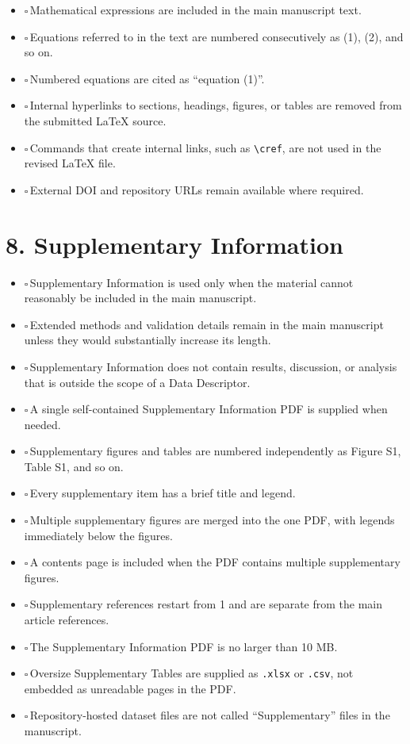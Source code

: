 \documentclass[11pt]{article}
\newcommand{\cbox}{$\square$\,}
\begin{document}
\begin{itemize}
    \item \cbox Mathematical expressions are included in the main manuscript text.
    \item \cbox Equations referred to in the text are numbered consecutively as (1), (2), and so on.
    \item \cbox Numbered equations are cited as ``equation (1)''.
    \item \cbox Internal hyperlinks to sections, headings, figures, or tables are removed from the submitted LaTeX source.
    \item \cbox Commands that create internal links, such as \texttt{\textbackslash cref}, are not used in the revised LaTeX file.
    \item \cbox External DOI and repository URLs remain available where required.
\end{itemize}

\section*{8. Supplementary Information}

\begin{itemize}
    \item \cbox Supplementary Information is used only when the material cannot reasonably be included in the main manuscript.
    \item \cbox Extended methods and validation details remain in the main manuscript unless they would substantially increase its length.
    \item \cbox Supplementary Information does not contain results, discussion, or analysis that is outside the scope of a Data Descriptor.
    \item \cbox A single self-contained Supplementary Information PDF is supplied when needed.
    \item \cbox Supplementary figures and tables are numbered independently as Figure S1, Table S1, and so on.
    \item \cbox Every supplementary item has a brief title and legend.
    \item \cbox Multiple supplementary figures are merged into the one PDF, with legends immediately below the figures.
    \item \cbox A contents page is included when the PDF contains multiple supplementary figures.
    \item \cbox Supplementary references restart from 1 and are separate from the main article references.
    \item \cbox The Supplementary Information PDF is no larger than 10 MB.
    \item \cbox Oversize Supplementary Tables are supplied as \texttt{.xlsx} or \texttt{.csv}, not embedded as unreadable pages in the PDF.
    \item \cbox Repository-hosted dataset files are not called ``Supplementary'' files in the manuscript.
\end{itemize}
\end{document}
